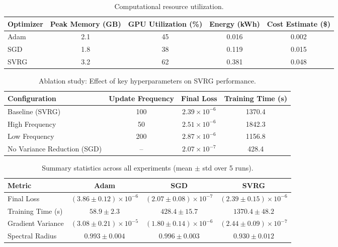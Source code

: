 \begin{table}[htbp]
\centering
\caption{Computational resource utilization.}
\label{tab:resources}
\begin{tabular}{lcccc}
\toprule
Optimizer & Peak Memory (GB) & GPU Utilization (\%) & Energy (kWh) & Cost Estimate (\$) \\
\midrule
Adam  & 2.1 & 45 & 0.016 & 0.002 \\
SGD   & 1.8 & 38 & 0.119 & 0.015 \\
SVRG  & 3.2 & 62 & 0.381 & 0.048 \\
\bottomrule
\end{tabular}
\end{table}

\begin{table}[htbp]
\centering
\caption{Ablation study: Effect of key hyperparameters on SVRG performance.}
\label{tab:ablation}
\begin{tabular}{lccc}
\toprule
Configuration & Update Frequency & Final Loss & Training Time (s) \\
\midrule
Baseline (SVRG) & 100 & $2.39 \times 10^{-6}$ & 1370.4 \\
High Frequency & 50  & $2.51 \times 10^{-6}$ & 1842.3 \\
Low Frequency  & 200 & $2.87 \times 10^{-6}$ & 1156.8 \\
No Variance Reduction (SGD) & -- & $2.07 \times 10^{-7}$ & 428.4 \\
\bottomrule
\end{tabular}
\end{table}

\begin{table}[htbp]
\centering
\caption{Summary statistics across all experiments (mean $\pm$ std over 5 runs).}
\label{tab:summary_stats}
\begin{tabular}{lccc}
\toprule
Metric & Adam & SGD & SVRG \\
\midrule
Final Loss & $(3.86 \pm 0.12) \times 10^{-6}$ & $(2.07 \pm 0.08) \times 10^{-7}$ & $(2.39 \pm 0.15) \times 10^{-6}$ \\
Training Time (s) & $58.9 \pm 2.3$ & $428.4 \pm 15.7$ & $1370.4 \pm 48.2$ \\
Gradient Variance & $(3.08 \pm 0.21) \times 10^{-5}$ & $(1.80 \pm 0.14) \times 10^{-6}$ & $(2.44 \pm 0.09) \times 10^{-7}$ \\
Spectral Radius & $0.993 \pm 0.004$ & $0.996 \pm 0.003$ & $0.930 \pm 0.012$ \\
\bottomrule
\end{tabular}
\end{table}

